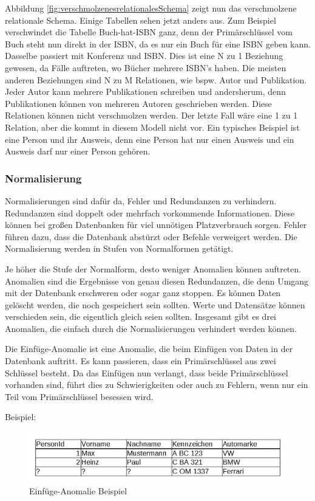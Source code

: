 Abbildung \ref{fig:verschmolzenesrelationalesSchema} zeigt nun das verschmolzene relationale Schema. Einige Tabellen sehen jetzt anders aus. Zum Beispiel verschwindet die Tabelle Buch-hat-ISBN ganz, denn der Primärschlüssel vom Buch steht nun direkt in der ISBN, da es nur ein Buch für eine ISBN geben kann. Dasselbe passiert mit Konferenz und ISBN. Dies ist eine N zu 1 Beziehung gewesen, da Fälle auftreten, wo Bücher mehrere ISBN’s haben. Die meisten anderen Beziehungen sind N zu M Relationen, wie bspw. Autor und Publikation. Jeder Autor kann mehrere Publikationen schreiben und andersherum, denn Publikationen können von mehreren Autoren geschrieben werden. Diese Relationen können nicht verschmolzen werden. Der letzte Fall wäre eine 1 zu 1 Relation, aber die kommt in diesem Modell nicht vor. Ein typisches Beispiel ist eine Person und ihr Ausweis, denn eine Person hat nur einen Ausweis und ein Ausweis darf nur einer Person gehören.


\subsubsection{Normalisierung}

Normalisierungen sind dafür da, Fehler und Redundanzen zu verhindern. Redundanzen
sind doppelt oder mehrfach vorkommende Informationen. Diese können bei großen
Datenbanken für viel unnötigen Platzverbrauch sorgen. Fehler führen dazu, dass die Datenbank abstürzt oder Befehle verweigert werden. Die Normalisierung werden in Stufen von Normalformen getätigt.

Je höher die Stufe der Normalform, desto weniger Anomalien können auftreten. Anomalien sind die Ergebnisse von genau diesen Redundanzen, die denn Umgang mit der Datenbank erschweren oder sogar ganz stoppen. Es können Daten gelöscht werden, die noch gespeichert sein sollten. Werte und Datensätze können verschieden sein, die eigentlich gleich seien sollten. Insgesamt gibt es drei Anomalien, die einfach durch die Normalisierungen verhindert werden können.

Die Einfüge-Anomalie ist eine Anomalie, die beim Einfügen von Daten in der Datenbank
auftritt. Es kann passieren, dass ein Primärschlüssel aus zwei Schlüssel besteht.
Da das Einfügen nun verlangt, dass beide Primärschlüssel vorhanden sind, führt dies zu Schwierigkeiten oder auch zu Fehlern, wenn nur ein Teil vom Primärschlüssel
besessen wird. 

Beispiel:
\begin{figure}[!htb]
	\centering
	\includegraphics[width=13cm,keepaspectratio]{bilder/KFZBeispiel}
	\caption{Einfüge-Anomalie Beispiel}
	\label{fig:kfzbeispiel}
\end{figure}


